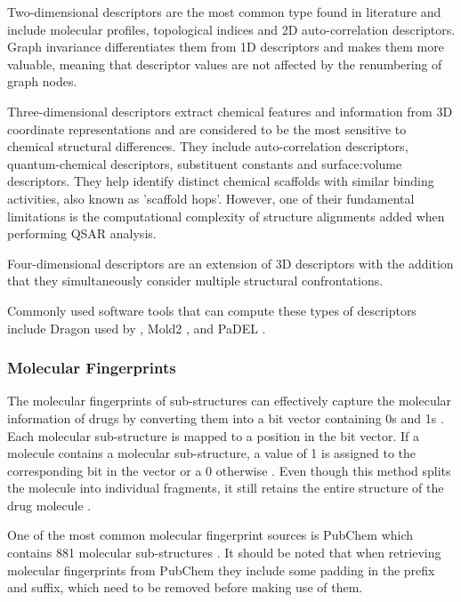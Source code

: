 Two-dimensional descriptors are the most common type found in literature and include molecular profiles, topological indices and 2D auto-correlation descriptors. Graph invariance differentiates them from 1D descriptors and makes them more valuable, meaning that descriptor values are not affected by the renumbering of graph nodes.

Three-dimensional descriptors extract chemical features and information from 3D coordinate representations and are considered to be the most sensitive to chemical structural differences. They include auto-correlation descriptors, quantum-chemical descriptors, substituent constants and surface:volume descriptors. They help identify distinct chemical scaffolds with similar binding activities, also known as 'scaffold hops'. However, one of their fundamental limitations is the computational complexity of structure alignments added when performing QSAR analysis.

Four-dimensional descriptors are an extension of 3D descriptors with the addition that they simultaneously consider multiple structural confrontations.

Commonly used software tools that can compute these types of descriptors include Dragon \citep{DRAGON} used by \citet{Shar2016}, Mold2 \citep{Mold2}, and PaDEL \citep{PaDEL}.

\subsubsection{Molecular Fingerprints}

The molecular fingerprints of sub-structures can effectively capture the molecular information of drugs by converting them into a bit vector containing 0s and 1s \citep{Wang2020}. Each molecular sub-structure is mapped to a position in the bit vector. If a molecule contains a molecular sub-structure, a value of 1 is assigned to the corresponding bit in the vector or a 0 otherwise \citep{PubChem_Fingerprints}. Even though this method splits the molecule into individual fragments, it still retains the entire structure of the drug molecule \citep{Wang2020}. 

One of the most common molecular fingerprint sources is PubChem \citep{PubChem} which contains 881 molecular sub-structures \citep{PubChem_Fingerprints}. It should be noted that when retrieving molecular fingerprints from PubChem \citep{PubChem} they include some padding in the prefix and suffix,  which need to be removed before making use of them. 

